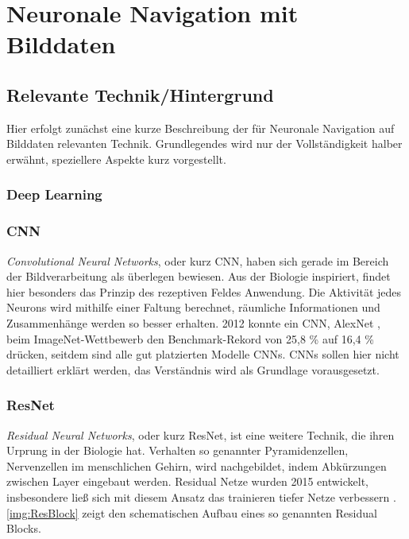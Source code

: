 
%
\chapter{Neuronale Navigation mit Bilddaten}

\section{Relevante Technik/Hintergrund}
Hier erfolgt zunächst eine kurze Beschreibung der für Neuronale Navigation auf Bilddaten relevanten Technik. Grundlegendes wird nur der Vollständigkeit halber erwähnt, speziellere Aspekte kurz vorgestellt. 

\subsection{Deep Learning}

\subsection{CNN}
\textit{Convolutional Neural Networks}, oder kurz CNN, haben sich gerade im Bereich der Bildverarbeitung als überlegen bewiesen. Aus der Biologie inspiriert, findet hier besonders das Prinzip des rezeptiven Feldes Anwendung. Die Aktivität jedes Neurons wird mithilfe einer Faltung berechnet, räumliche Informationen und Zusammenhänge werden so besser erhalten. 2012 konnte ein CNN, AlexNet \cite{krizhevsky2012imagenet}, beim ImageNet-Wettbewerb den Benchmark-Rekord von 25,8 \% auf 16,4 \% drücken, seitdem sind alle gut platzierten Modelle CNNs.
CNNs sollen hier nicht detailliert erklärt werden, das Verständnis wird als Grundlage vorausgesetzt.

\subsection{ResNet}
\textit{Residual Neural Networks}, oder kurz ResNet, ist eine weitere Technik, die ihren Urprung in der Biologie hat. Verhalten so genannter Pyramidenzellen, Nervenzellen im menschlichen Gehirn, wird nachgebildet, indem Abkürzungen zwischen Layer eingebaut werden. Residual Netze wurden 2015 entwickelt, insbesondere ließ sich mit diesem Ansatz das trainieren tiefer Netze verbessern \cite{DBLP:journals/corr/HeZRS15}. \ref{img:ResBlock} zeigt den schematischen Aufbau eines so genannten Residual Blocks. 


